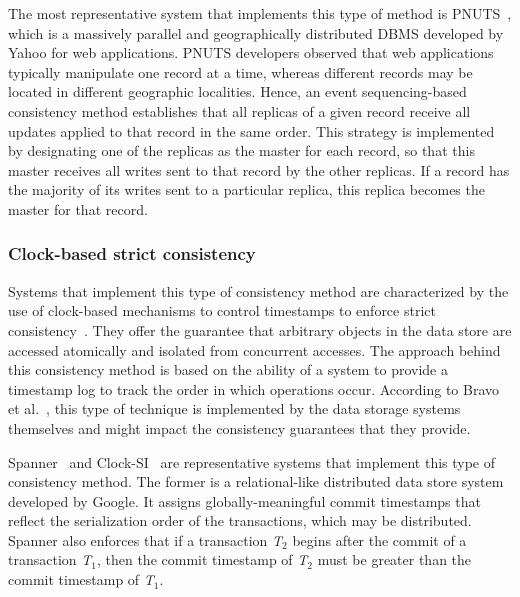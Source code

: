The most representative system that implements this type of method is PNUTS~\cite{cooper2008pnuts}, which is a massively parallel and geographically distributed DBMS developed by Yahoo for web applications. PNUTS developers observed that web applications typically manipulate one record at a time, whereas different records may be located in different geographic  localities. Hence, an event sequencing-based consistency method establishes that all replicas of a given record receive all updates applied to that record in the same order. This strategy is implemented by designating one of the replicas as the master for each record, so that this master receives all writes sent to that record by the other replicas. If a record has the majority of its writes sent to a particular replica, this replica becomes the master for that record.

\subsubsection{Clock-based strict consistency}

Systems that implement this type of consistency method are characterized by the use of clock-based mechanisms to control timestamps to enforce strict consistency~\cite{Corbett:2013, Du2013}. They offer the guarantee that arbitrary objects in the data store are accessed atomically and isolated from concurrent accesses.
The approach behind this consistency method is based on the ability of a system to provide a timestamp log to track the order in which operations occur. According to Bravo et al.~\cite{bravo2015use}, this type of technique is implemented by the data storage systems themselves and might impact the consistency guarantees that they provide.

Spanner~\cite{Corbett:2013} and Clock-SI~\cite{Du2013} are representative systems that implement this type of consistency method. The former is a relational-like distributed data store system developed by Google. It assigns globally\--mean\-ingful commit timestamps that reflect the serialization order of the transactions, which may be distributed. Spanner also enforces that if a transaction \textit{T$_{2}$} begins after the commit of a transaction \textit{T$_{1}$}, then the commit timestamp of \textit{T$_{2} $} must be greater than the commit timestamp of \textit{T$_{1}$}.

